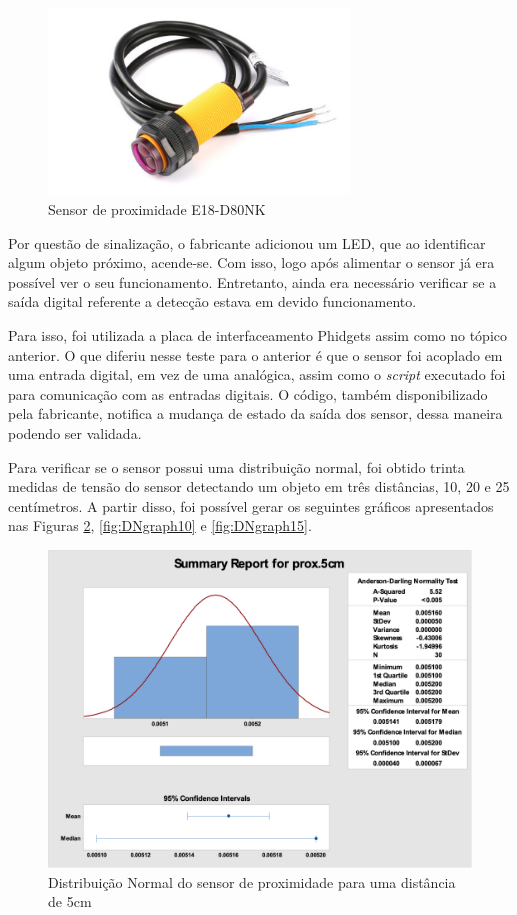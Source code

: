 		\begin{figure}[!ht]
		   \centering
		   \includegraphics[width=8cm]{Figures/proximity_sensor.jpg}
		   \caption{Sensor de proximidade E18-D80NK}
		   \label{fig:E18-D80NK}
		\end{figure}
		
		Por questão de sinalização, o fabricante adicionou um LED, que ao identificar algum objeto próximo, acende-se. Com isso, logo após alimentar o sensor já era possível ver o seu funcionamento. Entretanto, ainda era necessário verificar se a saída digital referente a detecção estava em devido funcionamento.
		
		Para isso, foi utilizada a placa de interfaceamento Phidgets assim como no tópico anterior. O que diferiu nesse teste para o anterior é que o sensor foi acoplado em uma entrada digital, em vez de uma analógica, assim como o \textit{script} executado foi para comunicação com as entradas digitais. O código, também disponibilizado pela fabricante, notifica a mudança de estado da saída dos sensor, dessa maneira podendo ser validada.
		
		Para verificar se o sensor possui uma distribuição normal, foi obtido trinta medidas de tensão do sensor detectando um objeto em três distâncias, 10, 20 e 25 centímetros. A partir disso, foi possível gerar os seguintes gráficos apresentados nas Figuras \ref{fig:DNgraph5}, \ref{fig:DNgraph10} e \ref{fig:DNgraph15}.
		
		
		\begin{figure}[!ht]
			   \centering
			   \includegraphics[width=14cm]{Figures/DNsensor5.png}
			   \caption{Distribuição Normal do sensor de proximidade para uma distância de 5cm}
			   \label{fig:DNgraph5}
		\end{figure}   
		
